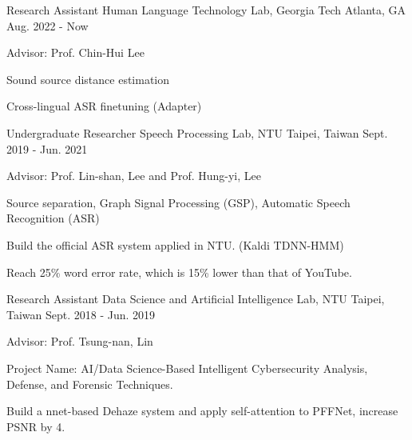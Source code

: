

\begin{cventries}

    \cventry
        {Research Assistant}
        {Human Language Technology Lab, Georgia Tech}
        {Atlanta, GA}
        {Aug. 2022 - Now}
        {
            \begin{cvitems}
                \item Advisor: Prof. Chin-Hui Lee
                \item Sound source distance estimation
                \item Cross-lingual ASR finetuning (Adapter)
            \end{cvitems}
        }
        
    \cventry
        {Undergraduate Researcher} %
        {Speech Processing Lab, NTU} %
        {Taipei, Taiwan} %
        {Sept. 2019 - Jun. 2021} %
        {
          \begin{cvitems} %
            \item Advisor: Prof. Lin-shan, Lee and Prof. Hung-yi, Lee
            \item Source separation, Graph Signal Processing (GSP), Automatic Speech Recognition (ASR)
            \item Build the official ASR system applied in NTU.  (Kaldi TDNN-HMM)
            \item Reach 25\% word error rate, which is 15\% lower than that of YouTube.
          \end{cvitems}
        }
    
    \cventry
        {Research Assistant} %
        {Data Science and Artificial Intelligence Lab, NTU} %
        {Taipei, Taiwan } %
        {Sept. 2018 - Jun. 2019} %
        {
          \begin{cvitems} %
            \item Advisor: Prof. Tsung-nan, Lin
            \item Project Name: AI/Data Science-Based Intelligent Cybersecurity Analysis, Defense, and Forensic Techniques.
            \item Build a nnet-based Dehaze system and apply self-attention to PFFNet, increase PSNR by 4.
          \end{cvitems}
        }
\end{cventries}